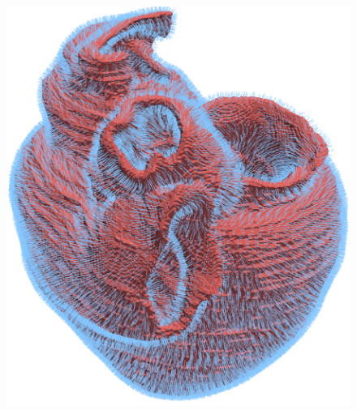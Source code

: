 \begin{figure}[ht!]
{		\includegraphics[scale=0.1]{media/2-shabaka/2-surf/2-normals.png}
\label{fig:shabakaseq2}}
\end{figure}
